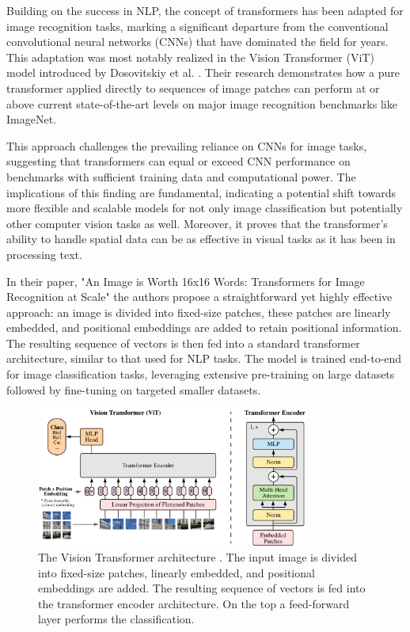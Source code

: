 Building on the success in NLP, the concept of transformers has been adapted 
for image recognition tasks, marking a significant departure from the 
conventional convolutional neural networks (CNNs) that have dominated the field 
for years. This adaptation was most notably realized in the Vision Transformer 
(ViT) model introduced by Dosovitskiy et al. \cite{vit}. Their research demonstrates how a 
pure transformer applied directly to sequences of image patches can perform at 
or above current state-of-the-art levels on major image recognition benchmarks 
like ImageNet.

This approach challenges the prevailing reliance on CNNs for image tasks, 
suggesting that transformers can equal or exceed CNN performance on benchmarks 
with sufficient training data and computational power. The implications of this 
finding are fundamental, indicating a potential shift towards more flexible and 
scalable models for not only image classification but potentially other computer 
vision tasks as well.
Moreover, it proves that the transformer's ability to handle 
spatial data can be as effective in visual tasks as it has been in 
processing text.

In their paper, "An Image is Worth 16x16 Words: Transformers for 
Image Recognition at Scale" \cite{vit} the authors propose a straightforward yet 
highly 
effective approach: an image is divided into fixed-size patches, these patches 
are linearly embedded, and positional embeddings are added to retain positional 
information. The resulting sequence of vectors is then fed into a standard 
transformer architecture, similar to that used for NLP tasks. The model is 
trained end-to-end for image classification tasks, leveraging extensive 
pre-training on large datasets followed by fine-tuning on targeted smaller 
datasets.

\begin{figure}
    \centering
    \includegraphics[width=0.8\textwidth]{images/vit/vit_scheme.png}
    \vspace*{0.3cm}
    \caption[The Vision Transformer architecture.]
    {The Vision Transformer architecture \cite{vit}. The input image is divided 
    into fixed-size patches, linearly embedded, and positional embeddings are 
    added. The resulting sequence of vectors is fed into the transformer encoder 
    architecture. On the top a feed-forward layer performs the classification.}
    \label{fig:vit_architecture}
\end{figure}

